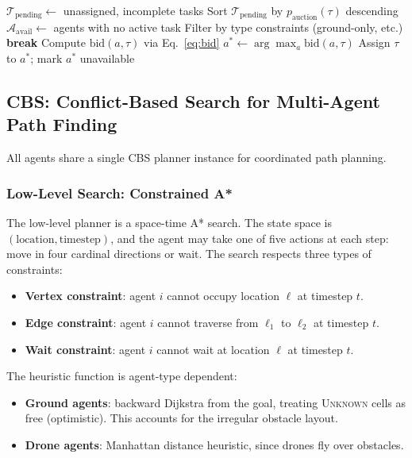 \documentclass[conference]{IEEEtran}
\begin{document}
\begin{algorithm}[t]
\caption{SSIA Auction Round}
\label{alg:ssia}
\begin{algorithmic}[1]
\STATE $\mathcal{T}_{\text{pending}} \gets$ unassigned, incomplete tasks
\STATE Sort $\mathcal{T}_{\text{pending}}$ by $p_{\text{auction}}(\tau)$ descending
    \STATE $\mathcal{A}_{\text{avail}} \gets$ agents with no active task
    \STATE Filter by type constraints (ground-only, etc.)
        \STATE \textbf{break}
    \ENDIF
        \STATE Compute $\text{bid}(a, \tau)$ via Eq.~\ref{eq:bid}
    \ENDFOR
    \STATE $a^* \gets \arg\max_{a} \text{bid}(a, \tau)$
    \STATE Assign $\tau$ to $a^*$; mark $a^*$ unavailable
\ENDFOR
\end{algorithmic}
\end{algorithm}

\subsection{CBS: Conflict-Based Search for Multi-Agent Path Finding}

All agents share a single CBS planner instance for coordinated path planning.

\subsubsection{Low-Level Search: Constrained A*}
The low-level planner is a space-time A* search. The state space is $(\text{location}, \text{timestep})$, and the agent may take one of five actions at each step: move in four cardinal directions or wait. The search respects three types of constraints:
\begin{itemize}
    \item \textbf{Vertex constraint}: agent $i$ cannot occupy location $\ell$ at timestep $t$.
    \item \textbf{Edge constraint}: agent $i$ cannot traverse from $\ell_1$ to $\ell_2$ at timestep $t$.
    \item \textbf{Wait constraint}: agent $i$ cannot wait at location $\ell$ at timestep $t$.
\end{itemize}

The heuristic function is agent-type dependent:
\begin{itemize}
    \item \textbf{Ground agents}: backward Dijkstra from the goal, treating \textsc{Unknown} cells as free (optimistic). This accounts for the irregular obstacle layout.
    \item \textbf{Drone agents}: Manhattan distance heuristic, since drones fly over obstacles.
\end{itemize}
\end{document}
